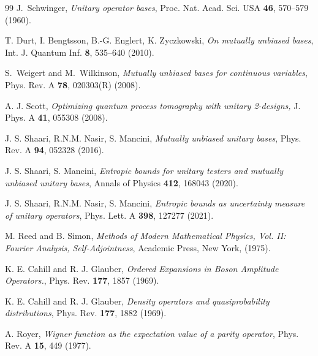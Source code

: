 \documentclass[aps,pra,onecolumn,nofootinbib,superscriptaddress,showpacs]{revtex4}
\begin{document}
\begin{thebibliography}{99}
J.~Schwinger, \emph{Unitary operator bases}, Proc. Nat. Acad. Sci. USA \textbf{46}, 570–579 (1960).

T. Durt, I. Bengtsson, B.-G. Englert, K. Zyczkowski, \emph{On mutually unbiased bases}, Int. J. Quantum
Inf. \textbf{8}, 535–640 (2010).

S.~Weigert and M.~Wilkinson,
\emph{Mutually unbiased bases for continuous variables},
Phys. Rev. A
\textbf{78}, 020303(R) (2008).

  A. J. Scott, \emph{Optimizing quantum process tomography with unitary 2-designs,} J. Phys. A \textbf{41}, 055308
(2008).

 J. S. Shaari, R.N.M. Nasir, S. Mancini, \emph{Mutually unbiased unitary bases}, Phys. Rev. A \textbf{94}, 052328
(2016).

 J. S. Shaari, S. Mancini, \emph{Entropic bounds for unitary testers and mutually
unbiased unitary bases}, Annals of Physics \textbf{412},  168043 (2020).

 J. S. Shaari, R.N.M. Nasir, S. Mancini, \emph{Entropic bounds as uncertainty measure of unitary operators}, Phys. Lett. A \textbf{398}, 127277 (2021).

M. Reed and B. Simon,
\textit{Methods of Modern Mathematical Physics, Vol. II: Fourier Analysis, Self-Adjointness},
Academic Press, New York, (1975).

K. E. Cahill and R. J. Glauber,
\emph{Ordered Expansions in Boson Amplitude Operators.},
Phys. Rev. \textbf{177}, 1857 (1969).


K. E. Cahill and R. J. Glauber,
\emph{Density operators and quasiprobability distributions},
Phys. Rev. \textbf{177}, 1882 (1969).

A. Royer,
\emph{Wigner function as the expectation value of a parity operator},
Phys. Rev. A \textbf{15}, 449 (1977).

\end{thebibliography}
\end{document}
